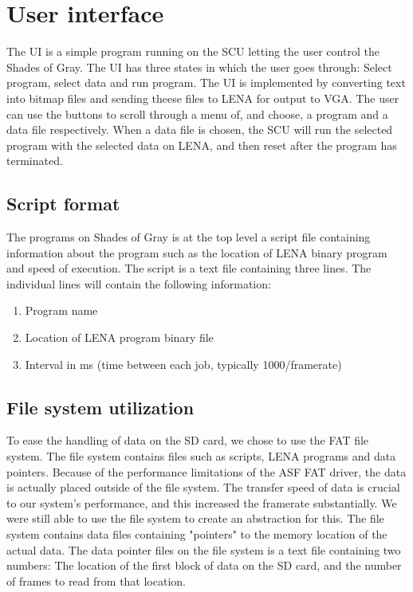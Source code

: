 \section{User interface}
The \ac{UI} is a simple program running on the \ac{SCU} letting the user control the { Shades of Gray}. The \ac{UI} has three states in which the user goes through: Select program, select data and run program. The \ac{UI} is implemented by converting text into bitmap files and sending theese files to \ac{LENA} for output to VGA. The user can use the buttons to scroll through a menu of, and choose, a program and a data file respectively. When a data file is chosen, the \ac{SCU} will run the selected program with the selected data on \ac{LENA}, and then reset after the program has terminated.


\subsection{Script format}
The programs on { Shades of Gray} is at the top level a script file
containing information about the program such as the location of \ac{LENA} binary program and speed of execution. The script is a text file containing three lines. The individual lines will
contain the following information:

\begin{enumerate}
\item Program name
\item Location of \ac{LENA} program binary file
\item Interval in ms (time between each job, typically 1000/framerate)
\end{enumerate}

\subsection{File system utilization}
To ease the handling of data on the SD card, we chose to use the FAT
file system. The file system contains files such as scripts, \ac{LENA} programs
and data pointers. Because of the performance limitations of the \ac{ASF} FAT driver, the data is actually
placed outside of the file system. The transfer speed of data is crucial to our
system's performance, and this increased the framerate substantially. We were
still able to use the file system to create an abstraction for this. The file
system contains data files containing "pointers" to the memory location of the
actual data. The data pointer files on the file system is a text file containing
two numbers: The location of the first block of data on the SD card,
and the number of frames to read from that location.

